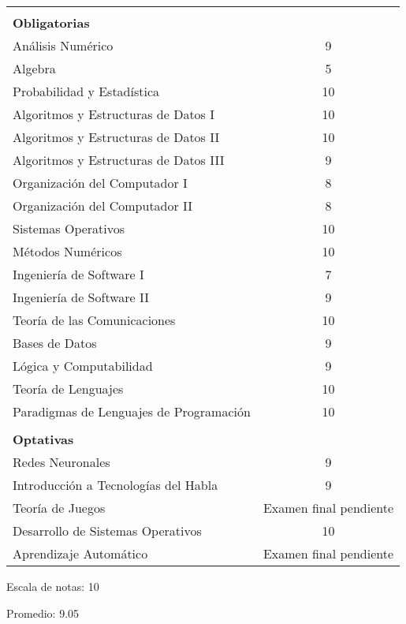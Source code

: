 \documentclass[a4paper,10pt]{article}
\begin{document}
\begin{tabular}{ l c }
&\\

\textbf{Obligatorias} \smallskip  & \\ 
Análisis Numérico & 9\\
Algebra & 5\\
Probabilidad y Estadística & 10\\
Algoritmos y Estructuras de Datos I & 10\\
Algoritmos y Estructuras de Datos II & 10\\
Algoritmos y Estructuras de Datos III & 9\\
Organización del Computador I & 8\\
Organización del Computador II & 8\\
Sistemas Operativos & 10\\
Métodos Numéricos & 10\\
Ingeniería de Software I & 7\\
Ingeniería de Software II & 9\\
Teoría de las Comunicaciones & 10\\
Bases de Datos & 9\\
Lógica y Computabilidad & 9\\
Teoría de Lenguajes & 10\\
Paradigmas de Lenguajes de Programación & 10\\
&\\

\textbf{Optativas} \smallskip & \\
Redes Neuronales & 9\\
Introducción a Tecnologías del Habla & 9\\
Teoría de Juegos & Examen final pendiente\\
Desarrollo de Sistemas Operativos & 10\\
Aprendizaje Automático & Examen final pendiente\\
\end{tabular}

\bigskip

Escala de notas: 10

Promedio: 9.05
\end{document}
